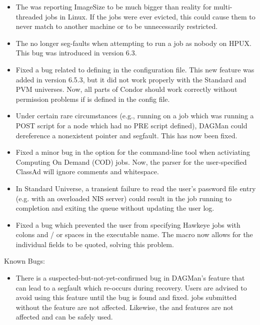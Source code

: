\begin{itemize}

\item The  was reporting ImageSize to be much bigger
than reality for multi-threaded jobs in Linux.  If the jobs were ever evicted,
this could cause them to never match to another machine or to be
unnecessarily restricted.

\item The  no longer seg-faults when attempting to run
  a job as nobody on HPUX. This bug was introduced in version 6.3.

\item Fixed a bug related to defining  in the
  configuration file.
  This new feature was added in version 6.5.3, but it did not work
  properly with the Standard and PVM universes.
  Now, all parts of Condor should work correctly without permission
  problems if  is defined in the config file.

\item Under certain rare circumstances (e.g., running  on a
       job which was running a POST script for a node
      which had no PRE script defined), DAGMan could dereference a
      nonexistent pointer and segfault.  This has now been fixed.

\item Fixed a minor bug in the  option for the
   command-line tool when activiating Computing On Demand
  (COD) jobs.
  Now, the parser for the user-specified ClassAd will ignore comments
  and whitespace.

\item In Standard Universe, a transient failure to read the user's
password file entry (e.g. with an overloaded NIS server) could
result in the job running to completion and exiting the queue
without updating the user log.

\item Fixed a bug which prevented the user from specifying Hawkeye
jobs with colons and / or spaces in the executable name.  The
 macro now allows for the individual fields to be
quoted, solving this problem.

\end{itemize}

\noindent Known Bugs:

\begin{itemize}

\item There is a suspected-but-not-yet-confirmed bug in DAGMan's
       feature that can lead to a segfault which
      re-occurs during recovery.  Users are advised to avoid using
      this feature until the bug is found and fixed.  
      jobs submitted without the  feature are not
      affected.  Likewise, the  and 
      features are not affected and can be safely used.

\end{itemize}



